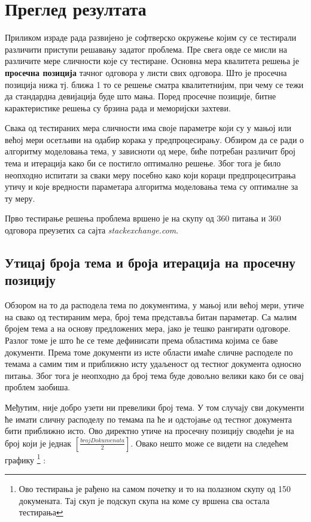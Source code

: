 \chapter{Преглед резултата}

Приликом израде  рада развијено је софтверско окружење којим су се тестирали различити приступи решавању задатог проблема. Пре свега овде се мисли на различите мере сличности које су тестиране.  Основна мера квалитета решења је \textbf{просечна позиција} тачног одговора у листи свих одговора. Што је просечна позиција нижа тј. ближа 1 то се решење сматра квалитетнијим, при чему се тежи да стандардна девијација буде што мања.
Поред просечне позиције, битне карактеристике решења су брзина рада и меморијски захтеви.

Свака од тестираних мера сличности има своје параметре који су у мањој или већој мери осетљиви на одабир корака  у предпроцесирању. Обзиром да се ради о алгоритму моделовања тема, у зависноти од мере, биће потребан различит број тема и итерација како би се постигло оптимално решење. Због тога је било неопходно испитати за сваки меру посебно како који кораци предпроцеситрања утичу и  које вредности параметара алгоритма моделовања тема су оптималне за ту меру.  

Прво тестирање решења проблема вршено је на скупу од 360 питања и 360 одговора преузетих са сајта \textit{stackexchange.com}. 


\section{Утицај броја тема и броја итерација на просечну позицију}

Обзором на то да расподела тема по документима, у мањој или већој мери, утиче на свако од тестираним мера, број тема представља битан параметар. Са малим бројем тема а на основу предложених мера, јако је тешко рангирати одговоре. Разлог томе је што ће се теме дефинисати према областима којима се баве документи. Према томе документи из исте области имаће сличне расподеле по темама а самим тим и приближно исту удаљеност од тестног документа односно питања. Због тога је неопходно да број тема буде довољно велики како би се овај проблем заобиша. 

Међутим, није добро узети ни превелики број тема. У том случају сви документи ће имати сличну расподелу по темама па ће и одстојање од тестног документа бити приближно исто. Ово директно утиче на просечну позицију сводећи је на број који је једнак $[\frac{brojDokumenata}{2}]$. Овако нешто може се видети на следећем графику \footnote{Ово тестирања  је рађено на самом почетку и то на полазном скупу од 150 докумената. Тај скуп је подскуп скупа на коме су вршена сва остала тестирања} :

